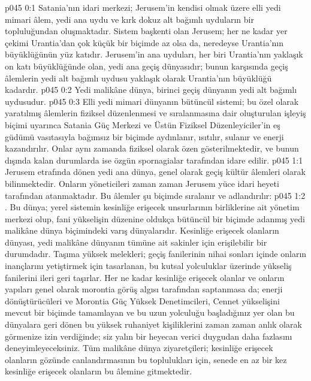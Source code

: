\vs p045 0:1 Satania’nın idari merkezi; Jerusem’in kendisi olmak üzere elli yedi mimari âlem, yedi ana uydu ve kırk dokuz alt bağımlı uyduların bir topluluğundan oluşmaktadır. Sistem başkenti olan Jerusem; her ne kadar yer çekimi Urantia’dan çok küçük bir biçimde az olsa da, neredeyse Urantia’nın büyüklüğünün yüz katıdır. Jerusem’in ana uyduları, her biri Urantia’nın yaklaşık on katı büyüklüğünde olan, yedi ana geçiş dünyasıdır; bunun karşısında geçiş âlemlerin yedi alt bağımlı uydusu yaklaşık olarak Urantia’nın büyüklüğü kadardır.
\vs p045 0:2 Yedi malikâne dünya, birinci geçiş dünyanın yedi alt bağımlı uydusudur.
\vs p045 0:3 Elli yedi mimari dünyanın bütüncül sistemi; bu özel olarak yaratılmış âlemlerin fiziksel düzenlenmesi ve sıralanmasına dair oluşturulan işleyiş biçimi uyarınca Satania Güç Merkezi ve Üstün Fiziksel Düzenleyiciler’in eş güdümü vasıtasıyla bağımsız bir biçimde aydınlanır, ısıtılır, sulanır ve enerji kazandırılır. Onlar aynı zamanda fiziksel olarak özen gösterilmektedir, ve bunun dışında kalan durumlarda ise özgün spornagialar tarafından idare edilir.
\vs p045 1:1 Jerusem etrafında dönen yedi ana dünya, genel olarak geçiş kültür âlemleri olarak bilinmektedir. Onların yöneticileri zaman zaman Jerusem yüce idari heyeti tarafından atanmaktadır. Bu âlemler şu biçimde sıralanır ve adlandırılır:
\vs p045 1:2 . Bu dünya; yerel sistemin kesinliğe erişecek unsurlarının birliklerine ait yönetim merkezi olup, fani yükselişin düzenine oldukça bütüncül bir biçimde adanmış yedi malikâne dünya biçimindeki varış dünyalarıdır. Kesinliğe erişecek olanların dünyası, yedi malikâne dünyanın tümüne ait sakinler için erişilebilir bir durumdadır. Taşıma yüksek melekleri; geçiş fanilerinin nihai sonları içinde onların inançlarını yetiştirmek için tasarlanan, bu kutsal yolculuklar üzerinde yükseliş fanilerini ileri geri taşırlar. Her ne kadar kesinliğe erişecek olanlar ve onların yapıları genel olarak morontia görüş algısı tarafından saptanmasa da; enerji dönüştürücüleri ve Morontia Güç Yüksek Denetimcileri, Cennet yükselişini mevcut bir biçimde tamamlayan ve bu uzun yolculuğu başladığınız yer olan bu dünyalara geri dönen bu yüksek ruhaniyet kişiliklerini zaman zaman anlık olarak görmenize izin verdiğinde; siz yalın bir heyecan verici duygudan daha fazlasını deneyimleyeceksiniz. Tüm malikâne dünya ziyaretçileri; kesinliğe erişecek olanların gözünde canlandırmasının bu toplulukları için, senede en az bir kez kesinliğe erişecek olanların bu âlemine gitmektedir.
